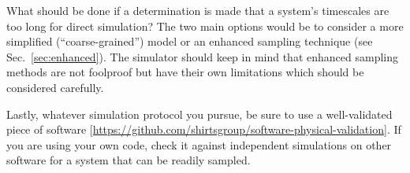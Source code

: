What should be done if a determination is made that a system's timescales are too long for direct simulation?
The two main options would be to consider a more simplified (``coarse-grained'') model \cite{Merchant2011,Kmiecik2016} or an enhanced sampling technique (see Sec.~\ref{sec:enhanced}).
The simulator should keep in mind that enhanced sampling methods are not foolproof but have their own limitations which should be considered carefully.

Lastly, whatever simulation protocol you pursue, be sure to use a well-validated piece of software [\url{https://github.com/shirtsgroup/software-physical-validation}].
If you are using your own code, check it against independent simulations on other software for a system that can be readily sampled.

